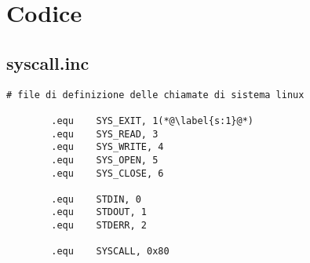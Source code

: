 \documentclass[a4paper,11pt]{article}
\begin{document}
	
		\section{Codice}
		
		\subsection{syscall.inc}
		
		\begin{lstlisting}[language=MyAssembler, style=MyAsm]
		# file di definizione delle chiamate di sistema linux
			
		.equ    SYS_EXIT, 1(*@\label{s:1}@*)
		.equ    SYS_READ, 3
		.equ    SYS_WRITE, 4
		.equ    SYS_OPEN, 5
		.equ    SYS_CLOSE, 6
			
		.equ    STDIN, 0
		.equ    STDOUT, 1
		.equ    STDERR, 2
			
		.equ    SYSCALL, 0x80
		\end{lstlisting}
\end{document}
